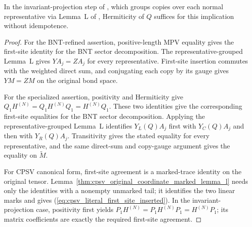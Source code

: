 \begin{lemma}
    In the invariant-projection step of
    \cite[Proposition~4.13, lines~1873--1887]{Cirac2016MPDO_arXiv}, which groups
    copies over each normal representative via Lemma~L of
    \cite[Appendix~C.3]{Cirac2016MPDO_arXiv}, Hermiticity of $Q$ suffices for this
    implication without idempotence.
\end{lemma}

\begin{proof}
    \leanok
    For the BNT-refined assertion, positive-length MPV equality
    gives the first-site identity for the BNT sector decomposition. The representative-grouped
    Lemma~L gives $YA_j=ZA_j$ for every representative. First-site insertion
    commutes with the weighted direct sum, and conjugating each copy by its
    gauge gives $YM=ZM$ on the original bond space.

    For the specialized assertion, positivity and Hermiticity give
    $Q_1H^{(N)}=Q_1H^{(N)}Q_1=H^{(N)}Q_1$. These two identities give the
    corresponding first-site equalities for the BNT sector decomposition. Applying the
    representative-grouped Lemma~L identifies $Y_L(Q)A_j$ first with
    $Y_C(Q)A_j$ and then with $Y_R(Q)A_j$. Transitivity gives the stated
    equality for every representative, and the same direct-sum and copy-gauge
    argument gives the equality on $\widetilde M$.

    For CPSV canonical form, first-site agreement is a marked-trace
    identity on the original tensor. Lemma~\ref{thm:cpsv_original_coordinate_marked_lemma_l}
    needs only the identities with a nonempty unmarked tail; it identifies the
    two linear marks and gives
    (\ref{eq:cpsv_literal_first_site_inserted}). In the invariant-projection
    case, positivity first yields
    $P_1H^{(N)}=P_1H^{(N)}P_1=H^{(N)}P_1$; its matrix coefficients are exactly
    the required first-site agreement.
\end{proof}

